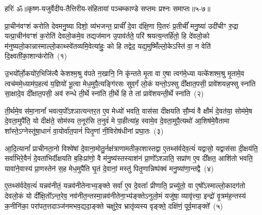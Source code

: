 {\anuvakamend[{यस्मि॑न्न॒ष्टौ च॑}]}%

{हरिः॑ ॐ}{॥कृष्ण-यजुर्वेदीय-तैत्तिरीय-संहितायां पञ्चम्काण्डे सप्तमः प्रश्नः समाप्तः॥५-७॥}


\setcounter{anuvakam}{0}
प्रा॒चीन॑वꣳशं करोति देवमनु॒ष्या दिशो॒ व्य॑भजन्त॒ प्राचीं᳚ दे॒वा द॑क्षि॒णा पि॒तरः॑ प्र॒तीचीं᳚ मनु॒ष्या॑ उदी॑चीꣳ रु॒द्रा यत्प्रा॒चीन॑वꣳशं क॒रोति॑ देवलो॒कमे॒व तद्यज॑मान उ॒पाव॑र्तते॒ परि॑ श्रयत्य॒न्तर्\mbox{}हि॑तो॒ हि दे॑वलो॒को म॑नुष्यलो॒का\-न्नास्माल्लो॒काथ्स्वे॑तव्यमि॒वेत्या॑हुः॒ को हि तद्वेद॒ यद्य॒मुष्मिँ॑ल्लो॒के\-ऽस्ति॑ वा॒ न वेति॑ दि॒क्ष्वती॑का॒शान्क॑रोति~(१)

उ॒भयो᳚र्लो॒कयो॑र॒भिजि॑त्यै केशश्म॒श्रु व॑पते न॒खानि॒ नि कृ॑न्तते मृ॒ता वा ए॒षा त्वग॑मे॒ध्या यत्के॑शश्म॒श्रु मृ॒तामे॒व त्वच॑ममे॒ध्याम॑प॒हत्य॑ य॒ज्ञियो॑ भू॒त्वा मेध॒मुपै॒त्यङ्गि॑रसः सुव॒र्गं लो॒कं यन्तो॒\-ऽफ्सु दी᳚क्षात॒पसी॒ प्रावे॑शयन्न॒फ्सु स्ना॑ति सा॒क्षादे॒व दी᳚क्षात॒पसी॒ अव॑ रुन्धे ती॒र्थे स्ना॑ति ती॒र्थे हि ते तां प्रावे॑शयन्ती॒र्थे स्ना॑ति~(२)

ती॒र्थमे॒व स॑मा॒नानां᳚ भवत्य॒पो᳚\-ऽश्ञात्यन्तर॒त ए॒व मेध्यो॑ भवति॒ वास॑सा दीक्षयति सौ॒म्यं वै क्षौमं॑ दे॒वत॑या॒ सोम॑मे॒ष दे॒वता॒मुपै॑ति॒ यो दीक्ष॑ते॒ सोम॑स्य त॒नूर॑सि त॒नुवं॑ मे पा॒हीत्या॑ह॒ स्वामे॒व दे॒वता॒मुपै॒त्यथो॑ आ॒शिष॑मे॒वैतामा शा᳚स्ते॒\-ऽग्नेस्तू॑षा॒धानं॑ वा॒योर्वा॑त॒पानं॑ पितृ॒णां नी॒विरोष॑धीनां प्रघा॒तः~(३)

आ॒दि॒त्यानां᳚ प्राचीनता॒नो विश्वे॑षां दे॒वाना॒मोतु॒र्नक्ष॑त्राणामतीका॒शास्तद्वा ए॒तथ्स॑र्वदेव॒त्यं॑ यद्वासो॒ यद्वास॑सा दी॒क्षय॑ति॒ सर्वा॑भिरे॒वैनं॑ दे॒वता॑भिर्दीक्षयति ब॒हिःप्रा॑णो॒ वै म॑नु॒ष्य॑स्तस्याश॑नं प्रा॒णो᳚\-ऽश्ञाति॒ सप्रा॑ण ए॒व दी᳚क्षत॒ आशि॑तो भवति॒ यावा॑ने॒वास्य॑ प्रा॒णस्तेन॑ स॒ह मेध॒मुपै॑ति घृ॒तं दे॒वानां॒ मस्तु॑ पितृ॒णान्निष्प॑क्वं मनु॒ष्या॑णा॒न्तद्वै~(४)

ए॒तथ्स॑र्वदेव॒त्यं॑ यन्नव॑नीतं॒ यन्नव॑नीतेनाभ्य॒ङ्क्ते सर्वा॑ ए॒व दे॒वताः᳚ प्रीणाति॒ प्रच्यु॑तो॒ वा ए॒षो᳚\-ऽस्माल्लो॒कादग॑तो देवलो॒कं यो दी᳚क्षि॒तो᳚\-ऽन्त॒रेव॒ नव॑नीत॒न्तस्मा॒न्नव॑नीतेना॒भ्य॑ङ्क्ते\-ऽनुलो॒मं यजु॑षा॒ व्यावृ॑त्त्या॒ इन्द्रो॑ वृ॒त्रम॑ह॒न्तस्य॑ क॒नीनि॑का॒ परा॑पत॒त्तदाञ्ज॑नमभव॒द्यदा॒ङ्क्ते चक्षु॑रे॒व भ्रातृ॑व्यस्य वृङ्क्ते॒ दक्षि॑णं॒ पूर्व॒माङ्क्ते᳚~(५)


